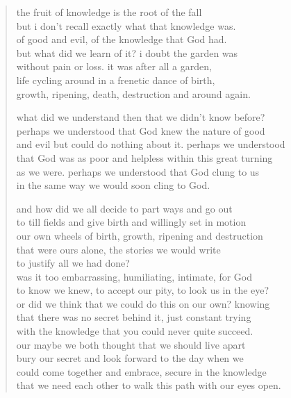 
\begin{verse}
the fruit of knowledge is the root of the fall \\
but i don't recall exactly what that knowledge was.\\
of good and evil, of the knowledge that God had. \\
but what did we learn of it? i doubt the garden was \\
without pain or loss. it was after all a garden,  \\
life cycling around in a frenetic dance of birth,  \\
growth, ripening, death, destruction and around again.

what did we understand then that we didn't know before? \\
perhaps we understood that God knew the nature of good \\
and evil but could do nothing about it. perhaps we understood \\
that God was as poor and helpless within this great turning \\
as we were. perhaps we understood that God clung to us \\
in the same way we would soon cling to God.

and how did we all decide to part ways and go out \\
to till fields and give birth and willingly set in motion  \\
our own wheels of birth, growth, ripening and destruction \\
that were ours alone, the stories we would write  \\
to justify all we had done? \\
was it too embarrassing, humiliating, intimate, for God \\
to know we knew, to accept our pity, to look us in the eye? \\
or did we think that we could do this on our own? knowing \\
that there was no secret behind it, just constant trying \\
with the knowledge that you could never quite succeed.  \\
our maybe we both thought that we should live apart \\
bury our secret and look forward to the day when we \\
could come together and embrace, secure in the knowledge \\
that we need each other to walk this path with our eyes open.
\end{verse}
